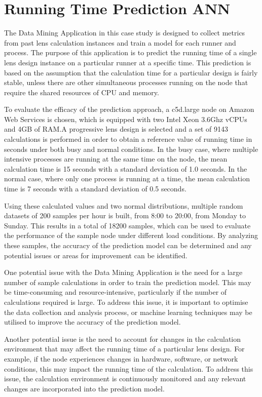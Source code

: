 \documentclass[10pt,a4paper]{report}
\begin{document}
 
\section{Running Time Prediction ANN}
\large\justify The Data Mining Application in this case study is designed to collect metrics from past lens calculation instances and train a model for each runner and process. The purpose of this application is to predict the running time of a single lens design instance on a particular runner at a specific time. This prediction is based on the assumption that the calculation time for a particular design is fairly stable, unless there are other simultaneous processes running on the node that require the shared resources of CPU and memory.

\large\justify To evaluate the efficacy of the prediction approach, a c5d.large node on Amazon Web Services is chosen, which is equipped with two Intel Xeon 3.6Ghz vCPUs and 4GB of RAM.A progressive lens design is selected and a set of 9143 calculations is performed in order to obtain a reference value of running time in seconds under both busy and normal conditions. In the busy case, where multiple intensive processes are running at the same time on the node, the mean calculation time is 15 seconds with a standard deviation of 1.0 seconds. In the normal case, where only one process is running at a time, the mean calculation time is 7 seconds with a standard deviation of 0.5 seconds.

\large\justify Using these calculated values and two normal distributions, multiple random datasets of 200 samples per hour is built, from 8:00 to 20:00, from Monday to Sunday. This results in a total of 18200 samples, which can be used to evaluate the performance of the sample node under different load conditions. By analyzing these samples, the accuracy of the prediction model can be determined and any potential issues or areas for improvement can be identified.

\large\justify One potential issue with the Data Mining Application is the need for a large number of sample calculations in order to train the prediction model. This may be time-consuming and resource-intensive, particularly if the number of calculations required is large. To address this issue, it is important to optimise the data collection and analysis process, or machine learning techniques may be utilised to improve the accuracy of the prediction model.

\large\justify Another potential issue is the need to account for changes in the calculation environment that may affect the running time of a particular lens design. For example, if the node experiences changes in hardware, software, or network conditions, this may impact the running time of the calculation. To address this issue, the calculation environment is continuously monitored and any relevant changes are incorporated into the prediction model.
\end{document}
